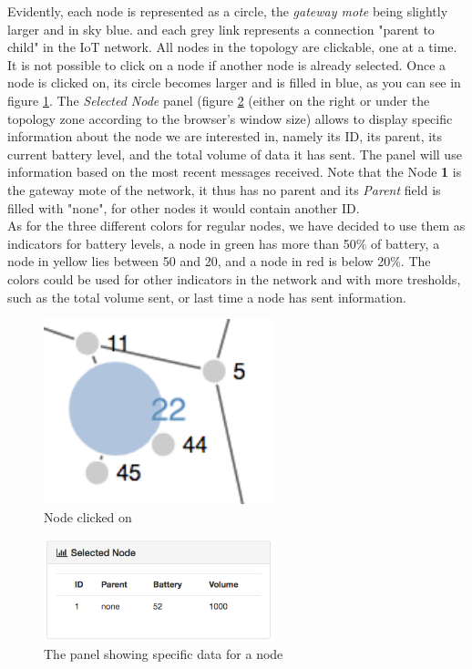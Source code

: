 Evidently, each node is represented as a circle, the \textit{gateway mote} being slightly larger and in sky blue. and each grey link represents a connection "parent to child" in the IoT network. All nodes in the topology are clickable, one at a time. It is not possible to click on a node if another node is already selected. Once a node is clicked on, its circle becomes larger and is filled in blue, as you can see in figure \ref{fig:snodeblue}. The \textit{Selected Node} panel (figure \ref{fig:snode} (either on the right or under the topology zone according to the browser's window size) allows to display specific information about the node we are interested in, namely its ID, its parent, its current battery level, and the total volume of data it has sent. The panel will use information based on the most recent messages received. Note that the Node \textbf{1} is the gateway mote of the network, it thus has no parent and its \textit{Parent} field is filled with "none", for other nodes it would contain another ID.\\

As for the three different colors for regular nodes, we have decided to use them as indicators for battery levels, a node in green has more than 50\% of battery, a node in yellow lies between 50 and 20, and a node in red is below 20\%. The colors could be used for other indicators in the network and with more tresholds, such as the total volume sent, or last time a node has sent information.\\

\begin{figure}[!h]
	\centering
	\includegraphics[width=0.6\textwidth]{res/snodeblue.png}
	\caption{Node clicked on}
	\label{fig:snodeblue}
\end{figure}


\begin{figure}[!h]
	\centering
	\includegraphics[width=0.6\textwidth]{res/snode.png}
	\caption{The panel showing specific data for a node}
	\label{fig:snode}
\end{figure}



